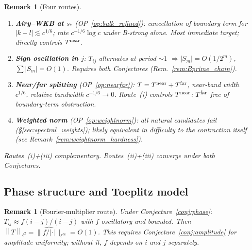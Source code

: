 \documentclass[12pt,a4paper]{article}
\newtheorem{remark}[theorem]{Remark}
\newcommand{\norm}[1]{\left\|#1\right\|}
\begin{document}
\begin{remark}[Four routes]\label{rem:routes}
\begin{enumerate}[nosep,label=(\roman*)]
  \item \textbf{Airy--WKB at $s_*$} (OP~\ref{op:bulk_refined}):
        cancellation of boundary term for $|k-l|\lesssim c^{1/6}$;
        rate $c^{-1/6}\log c$ under B-strong alone.
        Most immediate target; directly controls $T^{\rm near}$.
  \item \textbf{Sign oscillation in $j$}:
        $T_{ij}$ alternates at period $\sim1$
        $\Rightarrow|S_m|=O(1/2^m)$, $\sum|S_m|=O(1)$.
        Requires both Conjectures (Rem.~\ref{rem:Bprime_chain}).
  \item \textbf{Near/far splitting} (OP~\ref{op:nearfar}):
        $T=T^{\rm near}+T^{\rm far}$,
        near-band width $c^{1/6}$, relative bandwidth $c^{-1/6}\to0$.
        Route~(i) controls $T^{\rm near}$;
        $T^{\rm far}$ free of boundary-term obstruction.
  \item \textbf{Weighted norm} (OP~\ref{op:weightnorm}):
        all natural candidates fail (\S\ref{sec:spectral_weights});
        likely equivalent in difficulty to the contraction itself
        (see Remark~\ref{rem:weightnorm_hardness}).
\end{enumerate}
Routes~(i)+(iii) complementary.
Routes~(ii)+(iii) converge under both Conjectures.
\end{remark}

\subsection{Phase structure and Toeplitz model}
\label{sec:fourier}

\begin{remark}[Fourier-multiplier route]\label{rem:fourier_route}
Under Conjecture~\ref{conj:phase}: $T_{ij}\approx f(i-j)/(i-j)$
with $f$ oscillatory and bounded.
Then $\norm{T}_{\ell^2}=\|\widehat{f/|\cdot|}\|_{\ell^\infty}=O(1)$.
This requires Conjecture~\ref{conj:amplitude} for amplitude
uniformity; without it, $f$ depends on $i$ and $j$ separately.
\end{remark}
\end{document}
